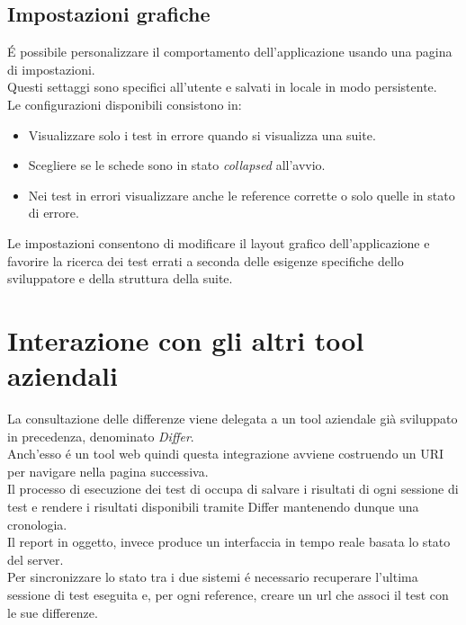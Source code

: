         \subsection{Impostazioni grafiche}
            \'E possibile personalizzare il comportamento dell'applicazione usando una pagina di impostazioni.\\
            Questi settaggi sono specifici all'utente e salvati in locale in modo persistente.\\
            Le configurazioni disponibili consistono in:
            \begin{itemize}
                \item Visualizzare solo i test in errore quando si visualizza una suite.
                \item Scegliere se le schede sono in stato \textit{collapsed} all'avvio.
                \item Nei test in errori visualizzare anche le reference corrette o solo quelle in stato di errore.
            \end{itemize}
            Le impostazioni consentono di modificare il layout grafico dell'applicazione e favorire la ricerca dei test errati a seconda delle esigenze specifiche dello sviluppatore e della struttura della suite.
    \section{Interazione con gli altri tool aziendali}
        La consultazione delle differenze viene delegata a un tool aziendale già sviluppato in precedenza, denominato \textit{Differ}.\\
        Anch'esso \'e un tool web quindi questa integrazione avviene  costruendo un URI per navigare nella pagina successiva.\\
        Il processo di esecuzione dei test di occupa di salvare i risultati di ogni sessione di test e rendere i risultati disponibili tramite Differ mantenendo dunque una cronologia.\\
        Il report in oggetto, invece produce un interfaccia in tempo reale basata lo stato del server.\\
        Per sincronizzare lo stato tra i due sistemi \'e necessario recuperare l'ultima sessione di test eseguita e, per ogni reference, creare un url che associ il test con le sue differenze.\\